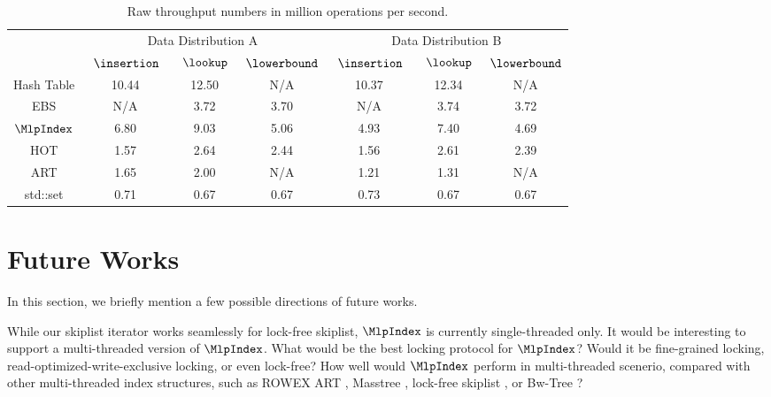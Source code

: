 \documentclass[11pt, usletter]{article}
\begin{document}
\begin{table}[!htb]
\centering
\begin{tabular}{|c|c|c|c|c|c|c|}
\hline
\multirow{2}{*}{} & \multicolumn{3}{c|}{Data Distribution A} & \multicolumn{3}{c|}{Data Distribution B} \\ \cline{2-7} 
                                                                             & \ $\insertion\ $   & \ $\lookup\ $   & $\lowerbound$   & \ $\insertion\ $   & \ $\lookup\ $   & $\lowerbound$   \\ \hline
Hash Table                                                                    & 10.44        & 12.50     & N/A           & 10.37        & 12.34     & N/A           \\ \hline
EBS                                                                          & N/A          & 3.72     & 3.70           & N/A          & 3.74      & 3.72           \\ \hline
$\MlpIndex$                                                                    & 6.80         & 9.03      & 5.06          & 4.93         & 7.40      & 4.69          \\ \hline
HOT                                                                          & 1.57         & 2.64      & 2.44          & 1.56         & 2.61      & 2.39          \\ \hline
ART                                                                          & 1.65         & 2.00      & N/A           & 1.21         & 1.31      & N/A           \\ \hline
std::set                                                                     & 0.71         & 0.67      & 0.67           & 0.73        & 0.67      & 0.67           \\ \hline
\end{tabular}
\caption{Raw throughput numbers in million operations per second.}
\label{mlpindex_results}
\end{table}

\section{Future Works} \label{futureworks}

In this section, we briefly mention a few possible directions of future works. 

While our skiplist iterator works seamlessly for lock-free skiplist, 
$\MlpIndex$ is currently single-threaded only. 
It would be interesting to support a multi-threaded version of $\MlpIndex$.
What would be the best locking protocol for $\MlpIndex$? 
Would it be fine-grained locking, read-optimized-write-exclusive locking, or even lock-free?
How well would $\MlpIndex$ perform in multi-threaded scenerio, 
compared with other multi-threaded index structures, such as ROWEX ART \cite{art_sync}, Masstree \cite{masstree},
lock-free skiplist \cite{lockfree_skiplist}, or Bw-Tree \cite{bwtree}?
\end{document}
